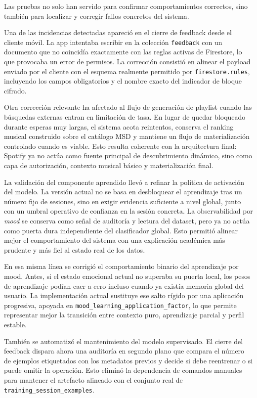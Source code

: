 Las pruebas no solo han servido para confirmar comportamientos correctos, sino
también para localizar y corregir fallos concretos del sistema.

Una de las incidencias detectadas apareció en el cierre de feedback desde el
cliente móvil. La app intentaba escribir en la colección \texttt{feedback} con
un documento que no coincidía exactamente con las reglas activas de Firestore,
lo que provocaba un error de permisos. La corrección consistió en alinear el
payload enviado por el cliente con el esquema realmente permitido por
\texttt{firestore.rules}, incluyendo los campos obligatorios y el nombre exacto
del indicador de bloque cifrado.

Otra corrección relevante ha afectado al flujo de generación de playlist cuando
las búsquedas externas entran en limitación de tasa. En lugar de quedar bloqueado
durante esperas muy largas, el sistema acota reintentos, conserva el ranking
musical construido sobre el catálogo MSD y mantiene un flujo de materialización
controlado cuando es viable. Esto resulta coherente con la arquitectura final:
Spotify ya no actúa como fuente principal de descubrimiento dinámico, sino como
capa de autorización, contexto musical básico y materialización final.

La validación del componente aprendido llevó a refinar la política
de activación del modelo. La versión actual no se basa en desbloquear el
aprendizaje tras un número fijo de sesiones, sino en exigir evidencia
suficiente a nivel global, junto con un umbral operativo de confianza en la
sesión concreta. La observabilidad por \textit{mood} se conserva como señal de
auditoría y lectura del dataset, pero ya no actúa como puerta dura
independiente del clasificador global. Esto permitió alinear mejor el
comportamiento del sistema con una explicación académica más prudente y más
fiel al estado real de los datos.

En esa misma línea se corrigió el comportamiento binario del aprendizaje por
mood. Antes, si el estado emocional actual no superaba su puerta local,
los pesos de aprendizaje podían caer a cero incluso cuando ya existía memoria
global del usuario. La implementación actual sustituye ese salto rígido por una
aplicación progresiva, apoyada en
\texttt{mood\_learning\_application\_factor}, lo que permite representar mejor
la transición entre contexto puro, aprendizaje parcial y perfil estable.

También se automatizó el mantenimiento del modelo supervisado. El cierre del
feedback dispara ahora una auditoría en segundo plano que compara el número de
ejemplos etiquetados con los metadatos previos y decide si debe reentrenar o
si puede omitir la operación. Esto eliminó la dependencia de comandos manuales
para mantener el artefacto alineado con el conjunto real de
\texttt{training\_session\_examples}.

